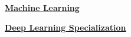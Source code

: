 
\begin{cventries}
\vspace{-6.5mm} %
 \begin{multicols}{2}
\begin{cvitems} %
        \item {\textbf{\href{https://coursera.org/share/1f5989232557e67fc63fca902ebeaf8d}{Machine Learning}}}
        \item {\textbf{\href{https://coursera.org/share/f63c6949eeb676e03bc5a0ee9143fd53}{Deep Learning Specialization}}}
      \end{cvitems}
\end{multicols}
    

\end{cventries}
